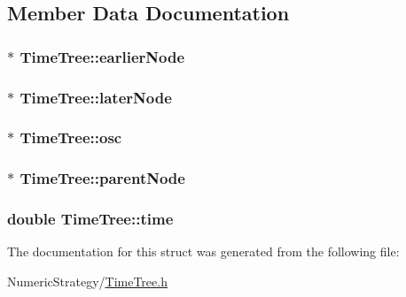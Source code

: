 \subsection{Member Data Documentation}
\hypertarget{struct_time_tree_a46ade43f75331b3d9582a3f0da6431c9}{
\subsubsection[{earlier\+Node}]{$\ast$ Time\+Tree\+::earlier\+Node}}\label{struct_time_tree_a46ade43f75331b3d9582a3f0da6431c9}
\hypertarget{struct_time_tree_aabf289bfd36c7bacba47caf3e54d9e85}{
\subsubsection[{later\+Node}]{$\ast$ Time\+Tree\+::later\+Node}}\label{struct_time_tree_aabf289bfd36c7bacba47caf3e54d9e85}
\hypertarget{struct_time_tree_a4facb804fe4af183557b396ce218aacc}{
\subsubsection[{osc}]{$\ast$ Time\+Tree\+::osc}}\label{struct_time_tree_a4facb804fe4af183557b396ce218aacc}
\hypertarget{struct_time_tree_a48e012db090e102c3970b3bf1d77ea3a}{
\subsubsection[{parent\+Node}]{$\ast$ Time\+Tree\+::parent\+Node}}\label{struct_time_tree_a48e012db090e102c3970b3bf1d77ea3a}
\hypertarget{struct_time_tree_a37fb85a78a8d379e61ffb910c0028597}{
\subsubsection[{time}]{\setlength{\rightskip}{0pt plus 5cm}double Time\+Tree\+::time}}\label{struct_time_tree_a37fb85a78a8d379e61ffb910c0028597}


The documentation for this struct was generated from the following file\+:\begin{DoxyCompactItemize}
\item 
Numeric\+Strategy/\hyperlink{_time_tree_8h}{Time\+Tree.\+h}\end{DoxyCompactItemize}
